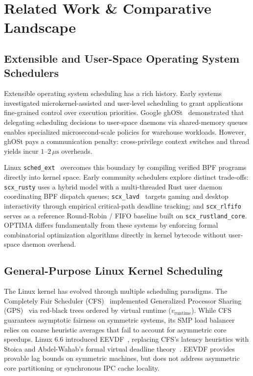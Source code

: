 \documentclass[letterpaper,twocolumn,10pt]{article}
\begin{document}
\section{Related Work \& Comparative Landscape}
\label{sec:related_work}

\subsection{Extensible and User-Space Operating System Schedulers}
Extensible operating system scheduling has a rich history. Early systems investigated microkernel-assisted and user-level scheduling to grant applications fine-grained control over execution priorities. Google ghOSt~\cite{humphries2021ghost} demonstrated that delegating scheduling decisions to user-space daemons via shared-memory queues enables specialized microsecond-scale policies for warehouse workloads. However, ghOSt pays a communication penalty: cross-privilege context switches and thread yields incur $1\text{--}2\,\mu\text{s}$ overheads. 

Linux \texttt{sched\_ext}~\cite{heo2024schedext,hodges2024schedextscale} overcomes this boundary by compiling verified BPF programs directly into kernel space. Early community schedulers explore distinct trade-offs: \texttt{scx\_rusty} uses a hybrid model with a multi-threaded Rust user daemon coordinating BPF dispatch queues; \texttt{scx\_lavd}~\cite{min2024scxlavd} targets gaming and desktop interactivity through empirical critical-path deadline tracking; and \texttt{scx\_rlfifo}~\cite{scx_repo} serves as a reference Round-Robin / FIFO baseline built on \texttt{scx\_rustland\_core}. OPTIMA differs fundamentally from these systems by enforcing formal combinatorial optimization algorithms directly in kernel bytecode without user-space daemon overhead.

\subsection{General-Purpose Linux Kernel Scheduling}
The Linux kernel has evolved through multiple scheduling paradigms. The Completely Fair Scheduler (CFS)~\cite{molnar2007cfs} implemented Generalized Processor Sharing (GPS)~\cite{parekh1993gps} via red-black trees ordered by virtual runtime ($v_{\text{runtime}}$). While CFS guarantees asymptotic fairness on symmetric systems, its SMP load balancer relies on coarse heuristic averages that fail to account for asymmetric core speedups. Linux 6.6 introduced EEVDF~\cite{zijlstra2023eevdf}, replacing CFS's latency heuristics with Stoica and Abdel-Wahab's formal virtual deadline theory~\cite{stoica1995eevdf,stoica1996proportional}. EEVDF provides provable lag bounds on symmetric machines, but does not address asymmetric core partitioning or synchronous IPC cache locality. 
\end{document}
